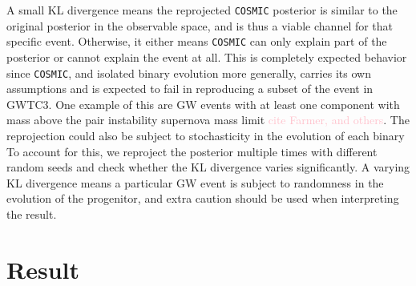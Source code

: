 \documentclass[twocolumn]{aastex631}
\newcommand{\kb}[1]{\textcolor{pink}{#1}}
\begin{document}
A small KL divergence means the reprojected \texttt{COSMIC} posterior is similar to the original posterior in the 
observable space, and is thus a viable channel for that specific event. Otherwise, it either means \texttt{COSMIC} 
can only explain part of the posterior or cannot explain the event at all. This is completely expected behavior since 
\texttt{COSMIC}, and isolated binary evolution more generally, carries its own assumptions and is expected to 
fail in reproducing a subset of the event in GWTC3. One example of this are GW events with at least one component 
with mass above the pair instability supernova mass limit \kb{cite Farmer, and others}.
The reprojection could also be subject to stochasticity in the evolution of each binary
To account for this, we reproject the posterior multiple times with different random seeds and 
check whether the KL divergence varies significantly. A varying KL divergence means a particular GW event is subject 
to randomness in the evolution of the progenitor, and extra caution should be used when interpreting the result.


\section{Result}
\label{sec:result}
    
\end{document}
